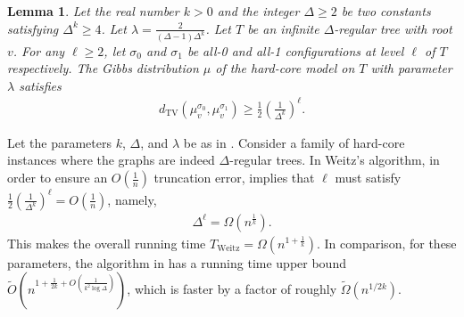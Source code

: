 \documentclass[10pt,a4paper]{article}
\newtheorem{lemma}{Lemma}[section]
\newcommand{\tp}[1]{{\left( #1 \right)}}
\newcommand{\dTV}{d_{\mathrm{TV}}}
\begin{document}
\begin{lemma}\label{lemma-inf-lower}
Let the real number $k > 0$ and the integer $\Delta \geq 2$ be two constants satisfying $\Delta^k \geq 4$.
Let  $\lambda = \frac{2}{(\Delta - 1)\Delta^{k}}$.
Let $T$ be an infinite $\Delta$-regular tree with root $v$.
For any $\ell \geq 2$, let $\sigma_0$ and $\sigma_1$ be all-0 and all-1 configurations at level $\ell$ of $T$ respectively.
The Gibbs distribution $\mu$ of the hard-core model on $T$ with parameter $\lambda$ satisfies 
\begin{align*}
	\dTV(\mu_v^{\sigma_0},\mu_v^{\sigma_1}) \geq \frac{1}{2}\tp{\frac{1}{\Delta^k}}^{\ell}.
\end{align*}
\end{lemma}

Let the parameters $k$, $\Delta$, and $\lambda$ be as in .
%
Consider a family of hard-core instances where the graphs are indeed $\Delta$-regular trees.
%
In Weitz's algorithm, in order to ensure an $O(\frac{1}{n})$ truncation error,
 implies that $\ell$ must satisfy $\frac{1}{2}\tp{\frac{1}{\Delta^k}}^{\ell} = O(\frac{1}{n})$,
namely,
\begin{align*}
	\Delta^\ell = \Omega(n^{\frac{1}{k}}).
\end{align*}
This makes the overall running time $T_{\mathrm{Weitz}}  = \Omega(n^{1 + \frac{1}{k}})$.
In comparison, for these parameters, the algorithm in  has a running time upper bound $\widetilde{O}\left(n^{1+\frac{1}{2k}+O(\frac{1}{k^2\log\Delta})}\right)$,
which is faster by a factor of roughly $\widetilde{\Omega}(n^{1/2k})$.


\end{document}

